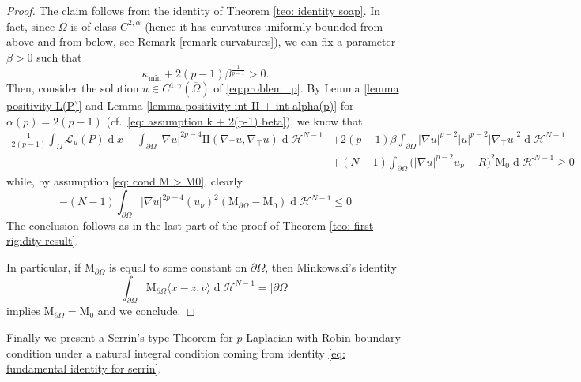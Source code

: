 \documentclass[10pt,a4paper]{amsart}
\numberwithin{equation}{section}
\renewcommand{\d}[1]{\ensuremath{\operatorname{d}\!{#1}}}
\begin{document}
    \begin{proof}
    The claim follows from the identity of Theorem \ref{teo: identity soap}. In fact, since $\Omega$ is of class $C^{2,\alpha}$ (hence it has curvatures uniformly bounded from above and from below, see Remark \ref{remark curvatures}), we can fix a parameter $\beta > 0$ such that
    \begin{equation}\label{eq: assumption k + 2(p-1) beta}
    \kappa_{\min} + 2(p-1)\beta^{\frac{1}{p-1}} > 0.
    \end{equation}
    Then, consider the solution $u \in C^{1,\gamma}(\overline{\Omega}) $ of \eqref{eq:problem_p}. By Lemma \ref{lemma positivity L(P)} and Lemma \ref{lemma positivity int II + int alpha(p)} for $\alpha(p)=2(p-1)$ (cf.\, \eqref{eq: assumption k + 2(p-1) beta}), we know that
    \begin{equation*}
    \begin{aligned}
    \frac{1}{2(p-1)}\int_\Omega \mathcal{L}_u(P) \d{x} 
    +\int_{\partial\Omega} |\nabla u|^{2p-4} \mathrm{I\!I}(\nabla_\top u,\nabla_\top u) \d{}\mathcal{H}^{N-1}
    &+ 2(p-1)\beta \int_{\partial\Omega} |\nabla u|^{p-2}|u|^{p-2}|\nabla_\top u|^2 \d{}\mathcal{H}^{N-1} 
    \\
    &+ (N-1) \int_{\partial\Omega} \Big(|\nabla u|^{p-2} u_\nu - R \Big)^2  \mathrm{M}_{0} \d{}\mathcal{H}^{N-1} 
    \geq 0
    \end{aligned}
    \end{equation*}
    while, by assumption \eqref{eq: cond M > M0}, clearly
    \begin{equation*}
        - (N-1) \int_{\partial\Omega} |\nabla u|^{2p-4} (u_\nu)^2 (\mathrm{M}_{\partial\Omega} - \mathrm{M}_{0} ) \d{}\mathcal{H}^{N-1}  \leq 0
    \end{equation*}
    The conclusion follows as in the last part of the proof of Theorem \ref{teo: first rigidity result}. 

    In particular, if $\mathrm{M}_{\partial\Omega}$ is equal to some constant on $\partial\Omega$, then Minkowski's identity 
    \begin{equation*}
        \int_{\partial\Omega} \mathrm{M}_{\partial\Omega} \langle x-z, \nu \rangle \d{}\mathcal{H}^{N-1} = |\partial\Omega| 
    \end{equation*}
    implies $\mathrm{M}_{\partial\Omega} = \mathrm{M}_{0}$ and we conclude.
\end{proof}

Finally we present a Serrin's type Theorem for $p$-Laplacian with Robin boundary condition under a natural integral condition coming from identity \eqref{eq: fundamental identity for serrin}.
\end{document}
